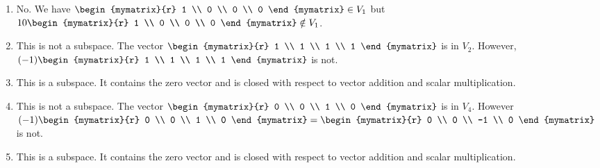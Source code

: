 \begin{ex}
  \begin{sol}
    \begin{enumerate}
    \item
      No. We have $\begin{mymatrix}{r}
        1 \\ 0 \\ 0 \\ 0
      \end{mymatrix} \in V_1$ but $10\begin{mymatrix}{r}
        1 \\ 0 \\ 0 \\ 0
      \end{mymatrix} \notin V_1$.
    \item
      This is not a subspace. The vector $\begin{mymatrix}{r}
        1 \\ 1 \\ 1 \\ 1
      \end{mymatrix}$
      is in $V_2$. However, $(-1) \begin{mymatrix}{r}
        1 \\ 1 \\ 1 \\ 1
      \end{mymatrix}$ is not.
    \item This is a subspace. It contains the zero vector and is
      closed with respect to vector addition and scalar
      multiplication.
    \item
      This
      is not a subspace. The vector $\begin{mymatrix}{r}
        0 \\ 0 \\ 1 \\ 0
      \end{mymatrix}$ is in $V_4$. However $(-1) \begin{mymatrix}{r}
        0 \\ 0 \\ 1 \\ 0
      \end{mymatrix}  = \begin{mymatrix}{r}
        0 \\ 0 \\ -1 \\ 0
      \end{mymatrix}$ is not.
    \item This is a subspace. It contains the zero vector and is
      closed with respect to vector addition and scalar
      multiplication.
    \end{enumerate}
  \end{sol}
\end{ex}

